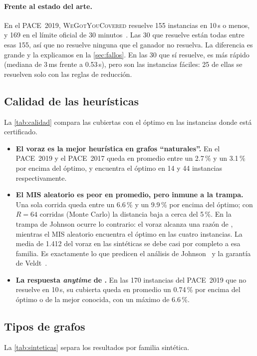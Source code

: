 \paragraph{Frente al estado del arte.} En el PACE~2019, \textsc{WeGotYouCovered} resuelve 155 instancias en 10\,s o menos, y 169 en el límite oficial de 30 minutos~\citep{hespe2020}. Las 30 que resuelve \hyvc{} están todas entre esas 155, así que \hyvc{} no resuelve ninguna que el ganador no resuelva. La diferencia es grande y la explicamos en la \cref{sec:fallos}. En las 30 que sí resuelve, \hyvc{} es más rápido (mediana de 3\,ms frente a 0.53\,s), pero son las instancias fáciles: 25 de ellas se resuelven solo con las reglas de reducción.

\subsection{Calidad de las heurísticas}
La \cref{tab:calidad} compara las cubiertas con el óptimo en las instancias donde está certificado.



\begin{itemize}
  \item \textbf{El voraz es la mejor heurística en grafos ``naturales''.} En el PACE~2019 y el PACE~2017 queda en promedio entre un 2.7\,\% y un 3.1\,\% por encima del óptimo, y encuentra el óptimo en 14 y 44 instancias respectivamente.
  \item \textbf{El MIS aleatorio es peor en promedio, pero inmune a la trampa.} Una sola corrida queda entre un 6.6\,\% y un 9.9\,\% por encima del óptimo; con $R=64$ corridas (Monte Carlo) la distancia baja a cerca del 5\,\%. En la trampa de Johnson ocurre lo contrario: el voraz alcanza una razón de , mientras el MIS aleatorio encuentra el óptimo en las cuatro instancias. La media de 1.412 del voraz en las sintéticas se debe casi por completo a esa familia. Es exactamente lo que predicen el análisis de Johnson~\citep{johnson1974} y la garantía de Veldt~\citep{veldt2024}.
  \item \textbf{La respuesta \emph{anytime} de \hyvc{}.} En las 170 instancias del PACE~2019 que no resuelve en 10\,s, su cubierta queda en promedio un 0.74\,\% por encima del óptimo o de la mejor conocida, con un máximo de 6.6\,\%.
\end{itemize}

\subsection{Tipos de grafos}
La \cref{tab:sinteticas} separa los resultados por familia sintética.

